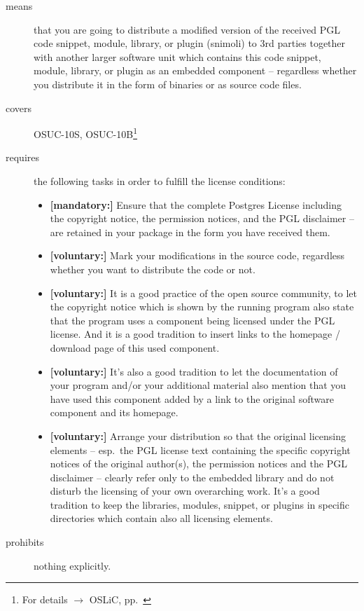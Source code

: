 \begin{description}

\item[means] that you are going to distribute a modified version of the received
PGL code snippet, module, library, or plugin (snimoli) to 3rd parties together
with another larger software unit which contains this code snippet, module,
library, or plugin as an embedded component -- regardless whether you distribute
it in the form of binaries or as source code files.

\item[covers] OSUC-10S, OSUC-10B\footnote{For details $\rightarrow$ OSLiC, pp.\
\pageref{OSUC-10S-DEF}}

\item[requires] the following tasks in order to fulfill the license conditions:
\begin{itemize}
  \item \textbf{[mandatory:]} Ensure that the complete Postgres License
  including the copyright notice, the permission notices, and the PGL disclaimer
  -- are retained in your package in the form you have received them.

  \item \textbf{[voluntary:]} Mark your modifications in the source code,
  regardless whether you want to distribute the code or not.
  
  \item \textbf{[voluntary:]} It is a good practice of the open source
  community, to let the copyright notice which is shown by the running program
  also state that the program uses a component being licensed under the PGL
  license. And it is a good tradition to insert links to the homepage / download
  page of this used component.

  \item \textbf{[voluntary:]} It's also a good tradition to let the
  documentation of your program and/or your additional material also mention
  that you have used this component added by a link to the original software
  component and its homepage.
  
  \item \textbf{[voluntary:]} Arrange your distribution so that the original
  licensing elements -- esp.\ the PGL license text containing the specific
  copyright notices of the original author(s), the permission notices and the
  PGL disclaimer --  clearly refer only to the embedded library and do not
  disturb the licensing of your own overarching work. It's a good tradition to
  keep the libraries, modules, snippet, or plugins in specific directories which
  contain also all licensing elements.
  
\end{itemize}

\item[prohibits] nothing explicitly.

\end{description}

